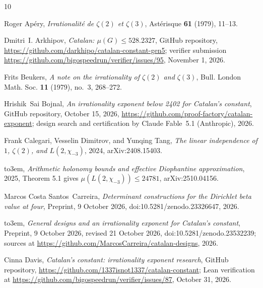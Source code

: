 \documentclass[11pt]{amsart}
\theoremstyle{definition}
\theoremstyle{remark}
\numberwithin{equation}{section}
\begin{document}
\providecommand{\bysame}{\leavevmode\hbox to3em{\hrulefill}\thinspace}
\providecommand{\MR}{\relax\ifhmode\unskip\space\fi MR }
\providecommand{\MRhref}[2]{%
  \href{http://www.ams.org/mathscinet-getitem?mr=#1}{#2}
}
\providecommand{\href}[2]{#2}
\begin{thebibliography}{10}

Roger Ap\'ery, \emph{Irrationalit\'e de {$\zeta(2)$} et {$\zeta(3)$}},
  Ast\'erisque \textbf{61} (1979), 11--13.

Dmitri~I. Arkhipov, \emph{Catalan: {$\mu(G)\le528.2327$}}, GitHub repository,
  \url{https://github.com/darkhipo/catalan-constant-gen5}; verifier submission
  \url{https://github.com/bigospeedrun/verifier/issues/95}, November 1, 2026.

Frits Beukers, \emph{A note on the irrationality of {$\zeta(2)$} and
  {$\zeta(3)$}}, Bull. London Math. Soc. \textbf{11} (1979), no.~3, 268--272.

Hrishik~Sai Bojnal, \emph{An irrationality exponent below 2402 for {C}atalan's
  constant}, GitHub repository, October 15, 2026,
  \url{https://github.com/proof-factory/catalan-exponent}; design search and
  certification by Claude Fable~5.1 (Anthropic), 2026.

Frank Calegari, Vesselin Dimitrov, and Yunqing Tang, \emph{The linear
  independence of {$1$}, {$\zeta(2)$}, and {$L(2,\chi_{-3})$}}, 2024,
  \href{https://arxiv.org/abs/2408.15403}{arXiv:2408.15403}.

\bysame, \emph{Arithmetic holonomy bounds and effective {D}iophantine
  approximation}, 2025, Theorem 5.1 gives $\mu(L(2,\chi_{-3}))\le 24781$,
  \href{https://arxiv.org/abs/2510.04156}{arXiv:2510.04156}.

Marcos Costa Santos~Carreira, \emph{Determinant constructions for the
  {D}irichlet beta value at four}, Preprint, 9 October 2026,
  \href{https://doi.org/10.5281/zenodo.23326647}{doi:10.5281/zenodo.23326647},
  2026.

\bysame, \emph{General designs and an irrationality exponent for {C}atalan's
  constant}, Preprint, 9 October 2026, revised 21 October 2026,
  \href{https://doi.org/10.5281/zenodo.23532239}{doi:10.5281/zenodo.23532239};
  sources at \url{https://github.com/MarcosCarreira/catalan-designs}, 2026.

Cinna Davis, \emph{Catalan's constant: irrationality exponent research}, GitHub
  repository, \url{https://github.com/1337isnot1337/catalan-constant}; Lean
  verification at \url{https://github.com/bigospeedrun/verifier/issues/87},
  October 31, 2026.


\end{thebibliography}
\end{document}
